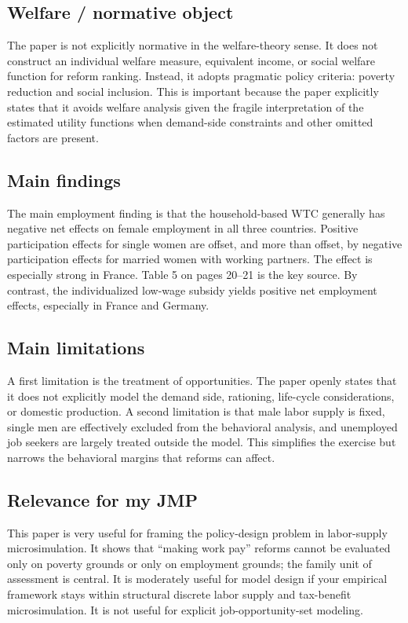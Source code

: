 \documentclass[11pt,a4paper]{article}
\begin{document}
\subsection*{Welfare / normative object}
The paper is not explicitly normative in the welfare-theory sense. It does not construct an individual welfare measure, equivalent income, or social welfare function for reform ranking. Instead, it adopts pragmatic policy criteria: poverty reduction and social inclusion. This is important because the paper explicitly states that it avoids welfare analysis given the fragile interpretation of the estimated utility functions when demand-side constraints and other omitted factors are present.

\subsection*{Main findings}
The main employment finding is that the household-based WTC generally has negative net effects on female employment in all three countries. Positive participation effects for single women are offset, and more than offset, by negative participation effects for married women with working partners. The effect is especially strong in France. Table 5 on pages 20–21 is the key source. By contrast, the individualized low-wage subsidy yields positive net employment effects, especially in France and Germany.

\subsection*{Main limitations}
A first limitation is the treatment of opportunities. The paper openly states that it does not explicitly model the demand side, rationing, life-cycle considerations, or domestic production. A second limitation is that male labor supply is fixed, single men are effectively excluded from the behavioral analysis, and unemployed job seekers are largely treated outside the model. This simplifies the exercise but narrows the behavioral margins that reforms can affect.

\subsection*{Relevance for my JMP}
This paper is very useful for framing the policy-design problem in labor-supply microsimulation. It shows that “making work pay” reforms cannot be evaluated only on poverty grounds or only on employment grounds; the family unit of assessment is central. It is moderately useful for model design if your empirical framework stays within structural discrete labor supply and tax-benefit microsimulation. It is not useful for explicit job-opportunity-set modeling.
\end{document}
